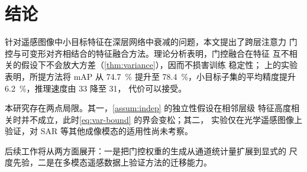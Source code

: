 \section{结论}
\label{sec:conclusion}

针对遥感图像中小目标特征在深层网络中衰减的问题，本文提出了跨层注意力
门控与可变形对齐相结合的特征融合方法。理论分析表明，门控融合在特征
互不相关的假设下不会放大方差（\cref{thm:variance}），因而不损害训练
稳定性；\dataset{} 上的实验表明，所提方法将 mAP 从 \qty{74.7}{\percent}
提升至 \qty{78.4}{\percent}，小目标子集的平均精度提升
\qty{6.2}{\percent}，推理速度由 \qty{33}{\fps} 降至 \qty{31}{\fps}，
代价可以接受。

本研究存在两点局限。其一，\cref{assum:indep} 的独立性假设在相邻层级
特征高度相关时并不成立，此时\cref{eq:var-bound} 的界会变松；其二，
实验仅在光学遥感图像上验证，对 SAR 等其他成像模态的适用性尚未考察。

后续工作将从两方面展开：一是把门控权重的生成从通道统计量扩展到显式的
尺度先验，二是在多模态遥感数据上验证方法的迁移能力。
